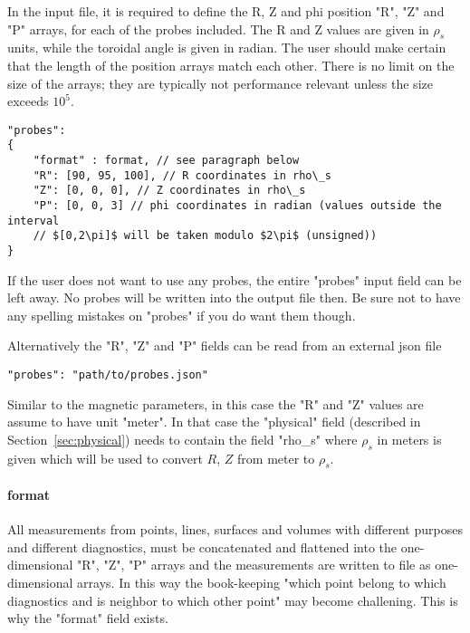 In the input file, it is required to define the R, Z and phi position "R", "Z"
and "P" arrays, for each of the probes included. The R and Z values are
given in $\rho_s$ units, while the toroidal angle is given in radian. The
user should make certain that the length of the position arrays match each
other.
There is no limit on the size of the arrays; they are typically not performance
relevant unless the size exceeds $10^5$.
\begin{verbatim}
"probes":
{
    "format" : format, // see paragraph below
    "R": [90, 95, 100], // R coordinates in rho\_s
    "Z": [0, 0, 0], // Z coordinates in rho\_s
    "P": [0, 0, 3] // phi coordinates in radian (values outside the interval
    // $[0,2\pi]$ will be taken modulo $2\pi$ (unsigned))
}
\end{verbatim}
\begin{tcolorbox}[title=Note]
 If the user does not want to use any probes, the entire "probes" input field
 can be left away. No probes will be written into the output file then.  Be
 sure not to have any spelling mistakes on "probes" if you do want them though.
\end{tcolorbox}
Alternatively the "R", "Z" and "P" fields can be read from an external json file
\begin{verbatim}
"probes": "path/to/probes.json"
\end{verbatim}
\begin{tcolorbox}[title=Units of $R$ and $Z$]
Similar to the magnetic parameters, in this case the "R" and "Z" values are
assume to have unit "meter".
In that case the "physical" field (described in Section~\ref{sec:physical}) needs
to contain the field "rho\_s" where $\rho_s$ in meters is given which will be
used to convert $R$, $Z$ from meter to $\rho_s$.
\end{tcolorbox}
\paragraph{format}
All measurements from points, lines, surfaces and volumes with different
purposes and different diagnostics, must be concatenated and flattened into the
one-dimensional "R", "Z", "P" arrays and the measurements are written to file
as one-dimensional arrays.  In this way the book-keeping "which point belong
to which diagnostics and is neighbor to which other point" may become
challening. This is why the "format" field exists.

